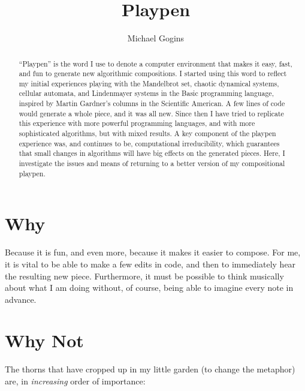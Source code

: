 \documentclass[a4paper,10pt]{scrartcl}
\title{Playpen}
\author{Michael Gogins}
\begin{document}
\maketitle

\begin{abstract}
``Playpen'' is the word I use to denote a computer environment that makes it 
easy, fast, and fun to generate new algorithmic compositions. I started using 
this word to reflect my initial experiences playing with the Mandelbrot set, 
chaotic dynamical systems, cellular automata, and Lindenmayer systems in 
the Basic programming language, inspired by Martin Gardner's columns in the 
Scientific American. A few lines of code would generate a whole piece, and it 
was all new. Since then I have tried to replicate this experience with more 
powerful programming languages, and with more sophisticated algorithms, but 
with mixed results. A key component of the playpen experience was, and 
continues to be, computational irreducibility, which guarantees that small 
changes in algorithms will have big effects on the generated pieces. Here, I 
investigate the issues and means of returning to a better version of my 
compositional playpen.
\end{abstract}

\section*{Why}

Because it is fun, and even more, because it makes it easier to compose. For 
me, it is vital to be able to make a few edits in code, and then to 
immediately hear the resulting new piece. Furthermore, it must be possible to 
think musically about what I am doing without, of course, being able to 
imagine every note in advance.

\section*{Why Not}

The thorns that have cropped up in my little garden (to change the metaphor) 
are, in \emph{increasing} order of importance:
\end{document}
